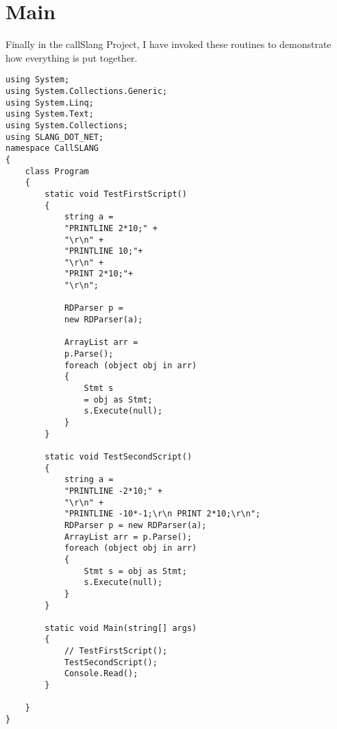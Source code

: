\section{Main}
Finally in the callSlang Project, I have invoked these routines to demonstrate how everything is put together.
\lstset{style=csharp}
\begin{lstlisting}
using System;
using System.Collections.Generic;
using System.Linq;
using System.Text;
using System.Collections;
using SLANG_DOT_NET;
namespace CallSLANG
{
	class Program
	{
		static void TestFirstScript()
		{
			string a = 
			"PRINTLINE 2*10;" + 
			"\r\n" + 
			"PRINTLINE 10;"+
			"\r\n" +
			"PRINT 2*10;"+
			"\r\n";

			RDParser p = 
			new RDParser(a);

			ArrayList arr = 
			p.Parse();
			foreach (object obj in arr)
			{
				Stmt s 
				= obj as Stmt;
				s.Execute(null);
			}
		}
		
		static void TestSecondScript()
		{
			string a = 
			"PRINTLINE -2*10;" + 
			"\r\n" + 
			"PRINTLINE -10*-1;\r\n PRINT 2*10;\r\n";
			RDParser p = new RDParser(a);
			ArrayList arr = p.Parse();
			foreach (object obj in arr)
			{
				Stmt s = obj as Stmt;
				s.Execute(null);
			}
		}
		
		static void Main(string[] args)
		{
			// TestFirstScript();
			TestSecondScript();
			Console.Read();
		}

	} 
}
\end{lstlisting}